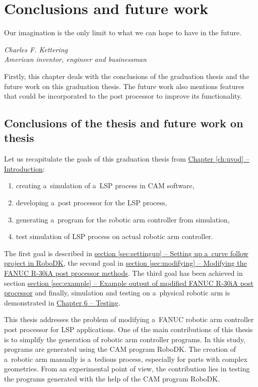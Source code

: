 ﻿\chapter{Conclusions and future work \label{chap:discussion}}

\epigraph{Our imagination is the only limit to what we can hope to have in the future.}{\textit{Charles F. Kettering \\ American inventor, engineer and businessman }}

Firstly, this chapter deals with the conclusions of the graduation thesis and the future work on this graduation thesis. The future work also mentions features that could be incorporated to the post processor to improve its functionality. 

\section{Conclusions of the thesis and future work on thesis}

Let us recapitulate the goals of this graduation thesis from \hyperref[ch:uvod]{Chapter \ref{ch:uvod} -- Introduction}:

\begin{enumerate}

    \item creating a~simulation of a~LSP process in CAM software,
    \item developing a~post processor for the LSP process, 
    \item generating a~program  for the robotic arm controller from simulation,
    \item test simulation of LSP process on actual robotic arm controller.
    
\end{enumerate}

\pagebreak[4]

The first goal is described in \hyperref[sec:settingup]{section \ref{sec:settingup} -- Setting up a~curve follow project in RoboDK}, the second goal in \hyperref[sec:modifying]{section \ref{sec:modifying} -- Modifying the FANUC R-30iA post processor methods}. The third goal has been achieved in section  \hyperref[sec:example]{section \ref{sec:example} -- Example output of modified FANUC R-30iA post processor} and finally, simulation and testing on a~physical robotic arm is demonstrated in \hyperref[chap:testing]{Chapter 6 -- Testing}.

This thesis addresses the problem of modifying a~FANUC robotic arm controller post processor for LSP applications. One of the main contributions of this thesis is to simplify the generation of robotic arm controller programs. In this study, programs are generated using the CAM  program RoboDK. The creation of a~robotic arm manually is a~tedious process, especially for parts with complex geometries. From an experimental point of view, the contribution lies in testing the programs generated with the help of the CAM program RoboDK.

